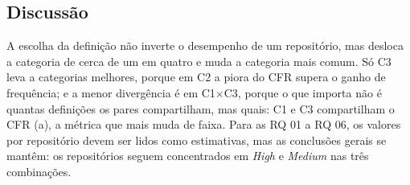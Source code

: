 \subsection{Discussão}

A escolha da definição não inverte o desempenho de um repositório, mas desloca a categoria de cerca de um em quatro e muda a categoria mais comum. Só C3 leva a categorias melhores, porque em C2 a piora do CFR supera o ganho de frequência; e a menor divergência é em C1$\times$C3, porque o que importa não é quantas definições os pares compartilham, mas quais: C1 e C3 compartilham o CFR (a), a métrica que mais muda de faixa. Para as RQ 01 a RQ 06, os valores por repositório devem ser lidos como estimativas, mas as conclusões gerais se mantêm: os repositórios seguem concentrados em \textit{High} e \textit{Medium} nas três combinações.
